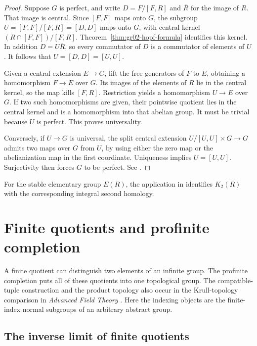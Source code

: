 \documentclass[11pt,oneside,openany]{book}
\theoremstyle{definition}
\theoremstyle{remark}
\begin{document}
\begin{proof}
Suppose \(G\) is perfect, and write \(D=F/[F,R]\) and
\(\overline R\) for the image of \(R\). That image is central.
Since \([F,F]\) maps onto \(G\), the subgroup
\(U=[F,F]/[F,R]=[D,D]\) maps onto \(G\), with central kernel
\((R\cap[F,F])/[F,R]\). Theorem~\ref{thm:gr02-hopf-formula}
identifies this kernel. In addition \(D=U\overline R\), so
every commutator of \(D\) is a commutator of elements of \(U\).
It follows that \(U=[D,D]=[U,U]\).

Given a central extension \(E\to G\), lift the free generators
of \(F\) to \(E\), obtaining a homomorphism \(F\to E\) over
\(G\). Its images of the elements of \(R\) lie in the central
kernel, so the map kills \([F,R]\). Restriction yields a
homomorphism \(U\to E\) over \(G\). If two such homomorphisms
are given, their pointwise quotient lies in the central kernel
and is a homomorphism into that abelian group. It must be
trivial because \(U\) is perfect. This proves universality.

Conversely, if \(U\to G\) is universal, the split central
extension \(U/[U,U]\times G\to G\) admits two maps over \(G\)
from \(U\), by using either the zero map or the abelianization
map in the first coordinate. Uniqueness implies \(U=[U,U]\).
Surjectivity then forces \(G\) to be perfect.
See \cite[Theorem 6.9.5]{weibel}.
\end{proof}

For the stable elementary group \(E(R)\), the application in
\cite[B12]{ktheory} identifies \(K_2(R)\) with the corresponding
integral second homology.
\chapter{Finite quotients and profinite completion}
\label{ch:gr02-profinite}

A finite quotient can distinguish two elements of an infinite group.
The profinite completion puts all of these quotients into one
topological group. The compatible-tuple construction and the product
topology also occur in the Krull-topology comparison in
\emph{Advanced Field Theory} \cite[Results T04--T06]{field}. Here the
indexing objects are the finite-index normal subgroups of an arbitrary
abstract group.

\section{The inverse limit of finite quotients}
\end{document}
